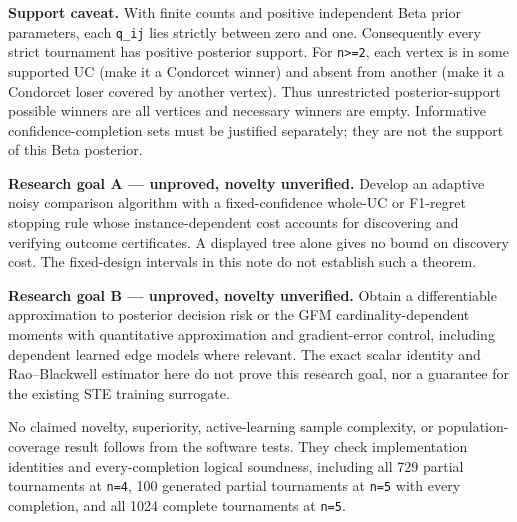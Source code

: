 \documentclass[
  11pt,
]{article}
\begin{document}
\textbf{Support caveat.} With finite counts and positive independent
Beta prior parameters, each \texttt{q\_ij} lies strictly between zero
and one. Consequently every strict tournament has positive posterior
support. For \texttt{n\textgreater{}=2}, each vertex is in some
supported UC (make it a Condorcet winner) and absent from another (make
it a Condorcet loser covered by another vertex). Thus unrestricted
posterior-support possible winners are all vertices and necessary
winners are empty. Informative confidence-completion sets must be
justified separately; they are not the support of this Beta posterior.

\textbf{Research goal A --- unproved, novelty unverified.} Develop an
adaptive noisy comparison algorithm with a fixed-confidence whole-UC or
F1-regret stopping rule whose instance-dependent cost accounts for
discovering and verifying outcome certificates. A displayed tree alone
gives no bound on discovery cost. The fixed-design intervals in this
note do not establish such a theorem.

\textbf{Research goal B --- unproved, novelty unverified.} Obtain a
differentiable approximation to posterior decision risk or the GFM
cardinality-dependent moments with quantitative approximation and
gradient-error control, including dependent learned edge models where
relevant. The exact scalar identity and Rao--Blackwell estimator here do
not prove this research goal, nor a guarantee for the existing STE
training surrogate.

No claimed novelty, superiority, active-learning sample complexity, or
population-coverage result follows from the software tests. They check
implementation identities and every-completion logical soundness,
including all 729 partial tournaments at \texttt{n=4}, 100 generated
partial tournaments at \texttt{n=5} with every completion, and all 1024
complete tournaments at \texttt{n=5}.
\end{document}

